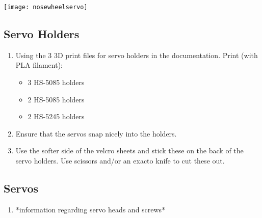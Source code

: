 \documentclass{article}
\begin{document}
\begin{center}
\texttt{[image: nosewheelservo]}
\end{center}


\clearpage
\subsection{Servo Holders}
   \begin {enumerate}
   \item Using the 3 3D print files for servo holders in the documentation. Print (with PLA filament):
   	\begin{itemize} 
	\item 3 HS-5085 holders
	\item 2 HS-5085 holders
	\item 2 HS-5245 holders 
	\end{itemize}
   \item Ensure that the servos snap nicely into the holders. 
   \item Use the softer side of the velcro sheets and stick these on the back of the servo holders. Use scissors and/or an exacto knife to cut these out.
   \end{enumerate}
   
\subsection{Servos}
   \begin{enumerate}
   \item *information regarding servo heads and screws*
   \end{enumerate}
\end{document}

